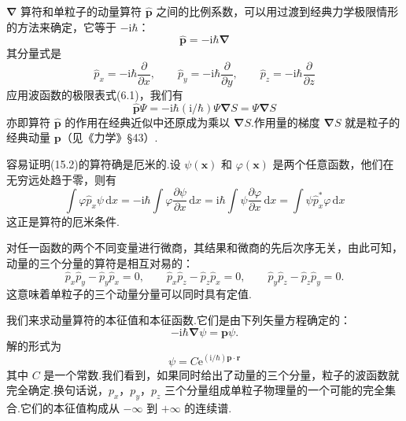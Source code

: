 $\boldsymbol{\nabla}$ 算符和单粒子的动量算符 $\hat{\boldsymbol{p}}$ 之间的比例系数，可以用过渡到经典力学极限情形的方法来确定，它等于 $-\mathrm{i}\hbar$：
\begin{equation}
  \hat{\boldsymbol{p}}=-\mathrm{i}\hbar\boldsymbol{\nabla}
\end{equation}
其分量式是
\begin{equation*}
  \hat{p}_x=-\mathrm{i}\hbar\frac{\partial}{\partial x},\qquad
  \hat{p}_y=-\mathrm{i}\hbar\frac{\partial}{\partial y},\qquad
  \hat{p}_z=-\mathrm{i}\hbar\frac{\partial}{\partial z}
\end{equation*}
应用波函数的极限表式(6.1)，我们有
\begin{equation*}
  \hat{\boldsymbol{p}}\varPsi
  =-\mathrm{i}\hbar(\mathrm{i}/\hbar)\varPsi\boldsymbol{\nabla}S
  =\varPsi\boldsymbol{\nabla}S
\end{equation*}
亦即算符 $\hat{\boldsymbol{p}}$ 的作用在经典近似中还原成为乘以 $\boldsymbol{\nabla}S$.作用量的梯度 $\boldsymbol{\nabla}S$ 就是粒子的经典动量 $\boldsymbol{p}$（见《力学》§43）.

容易证明(15.2)的算符确是厄米的.设 $\psi(\boldsymbol{x})$ 和 $\varphi(\boldsymbol{x})$ 是两个任意函数，他们在无穷远处趋于零，则有
\begin{equation*}
  \int\varphi\hat{p}_x\psi\,\mathrm{d}x
  =-\mathrm{i}\hbar\int\varphi\frac{\partial\psi}{\partial x}\,\mathrm{d}x
  =\mathrm{i}\hbar\int\psi\frac{\partial\varphi}{\partial x}\,\mathrm{d}x
  =\int\psi\hat{p}_x^{*}\varphi\,\mathrm{d}x
\end{equation*}
这正是算符的厄米条件.

对任一函数的两个不同变量进行微商，其结果和微商的先后次序无关，由此可知，动量的三个分量的算符是相互对易的：
\begin{equation}
  \hat{p}_x\hat{p}_y-\hat{p}_y\hat{p}_x=0,\qquad
  \hat{p}_x\hat{p}_z-\hat{p}_z\hat{p}_x=0,\qquad
  \hat{p}_y\hat{p}_z-\hat{p}_z\hat{p}_y=0.
\end{equation}
这意味着单粒子的三个动量分量可以同时具有定值.

我们来求动量算符的本征值和本征函数.它们是由下列矢量方程确定的：
\begin{equation}
  -\mathrm{i}\hbar\boldsymbol{\nabla}\psi=\boldsymbol{p}\psi.
\end{equation}
解的形式为
\begin{equation}
  \psi=C\mathrm{e}^{(\mathrm{i}/\hbar)\boldsymbol{p}\cdot\boldsymbol{r}}
\end{equation}
其中 $C$ 是一个常数.我们看到，如果同时给出了动量的三个分量，粒子的波函数就完全确定.换句话说，$p_x$，$p_y$，$p_z$ 三个分量组成单粒子物理量的一个可能的完全集合.它们的本征值构成从 $-\infty$ 到 $+\infty$ 的连续谱.

